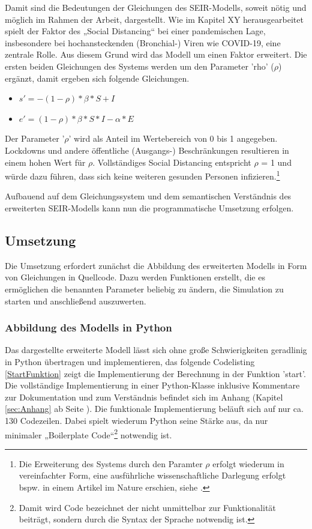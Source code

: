 \documentclass[12pt]{article}
\begin{document}
Damit sind die Bedeutungen der Gleichungen des SEIR-Modells, soweit nötig und möglich im Rahmen der Arbeit, dargestellt. Wie im Kapitel XY herausgearbeitet spielt der Faktor des „Social Distancing“ bei einer pandemischen Lage, insbesondere bei hochansteckenden (Bronchial-) Viren wie COVID-19, eine zentrale Rolle. Aus diesem Grund wird das Modell um einen Faktor erweitert. Die ersten beiden Gleichungen des Systems werden um den Parameter 'rho' ($\rho$) ergänzt, damit ergeben sich folgende Gleichungen.

\begin{itemize}
    \item $s' = -(1-\rho)*\beta*S+I$
    \item $e' = (1-\rho)*\beta*S*I-\alpha*E$
\end{itemize}

Der Parameter '$\rho$' wird als Anteil im Wertebereich von 0 bis 1 angegeben. Lockdowns und andere öffentliche (Ausgangs-) Beschränkungen resultieren in einem hohen Wert für $\rho$. Vollständiges Social Distancing entspricht $\rho$ = 1 und würde dazu führen, dass sich keine weiteren gesunden Personen infizieren.\footnote{Die Erweiterung des Systems durch den Paramter $\rho$ erfolgt wiederum in vereinfachter Form, eine ausführliche wissenschaftliche Darlegung erfolgt bspw. in einem Artikel im Nature erschien, siehe \cite{EffectSocDist}.}

Aufbauend auf dem Gleichungssystem und dem semantischen Verständnis des erweiterten SEIR-Modells kann nun die programmatische Umsetzung erfolgen.

\subsection{Umsetzung}
Die Umsetzung erfordert zunächst die Abbildung des erweiterten Modells in Form von Gleichungen in Quellcode. Dazu werden Funktionen erstellt, die es ermöglichen die benannten Parameter beliebig zu ändern, die Simulation zu starten und anschließend auszuwerten.

\subsubsection{Abbildung des Modells in Python}
Das dargestellte erweiterte Modell lässt sich ohne große Schwierigkeiten geradlinig in Python übertragen und implementieren, das folgende Codelisting \ref{StartFunktion} zeigt die Implementierung der Berechnung in der Funktion 'start'. Die vollständige Implementierung in einer Python-Klasse inklusive Kommentare zur Dokumentation und zum Verständnis befindet sich im Anhang (Kapitel \ref{sec:Anhang} ab Seite \pageref{sec:Anhang}). Die funktionale Implementierung beläuft sich auf nur ca. 130 Codezeilen. Dabei spielt wiederum Python seine Stärke aus, da nur minimaler „Boilerplate Code“\footnote{Damit wird Code bezeichnet der nicht unmittelbar zur Funktionalität beiträgt, sondern durch die Syntax der Sprache notwendig ist.} notwendig ist.
\end{document}
